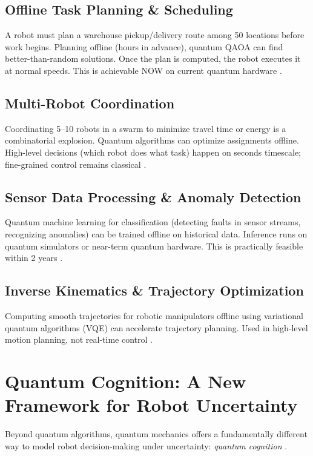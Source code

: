 \documentclass[conference]{IEEEtran}
\begin{document}
\subsection{Offline Task Planning \& Scheduling}

A robot must plan a warehouse pickup/delivery route among 50 locations before work begins. Planning offline (hours in advance), quantum QAOA can find better-than-random solutions. Once the plan is computed, the robot executes it at normal speeds. This is achievable NOW on current quantum hardware \cite{b15, b18, b37}.

\subsection{Multi-Robot Coordination}

Coordinating 5--10 robots in a swarm to minimize travel time or energy is a combinatorial explosion. Quantum algorithms can optimize assignments offline. High-level decisions (which robot does what task) happen on seconds timescale; fine-grained control remains classical \cite{b38, b39, b40}.

\subsection{Sensor Data Processing \& Anomaly Detection}

Quantum machine learning for classification (detecting faults in sensor streams, recognizing anomalies) can be trained offline on historical data. Inference runs on quantum simulators or near-term quantum hardware. This is practically feasible within 2 years \cite{b41, b42, b43}.

\subsection{Inverse Kinematics \& Trajectory Optimization}

Computing smooth trajectories for robotic manipulators offline using variational quantum algorithms (VQE) can accelerate trajectory planning. Used in high-level motion planning, not real-time control \cite{b44, b45, b34}.

\section{Quantum Cognition: A New Framework for Robot Uncertainty}

Beyond quantum algorithms, quantum mechanics offers a fundamentally different way to model robot decision-making under uncertainty: \textit{quantum cognition} \cite{b46, b47, b48}.
\end{document}
